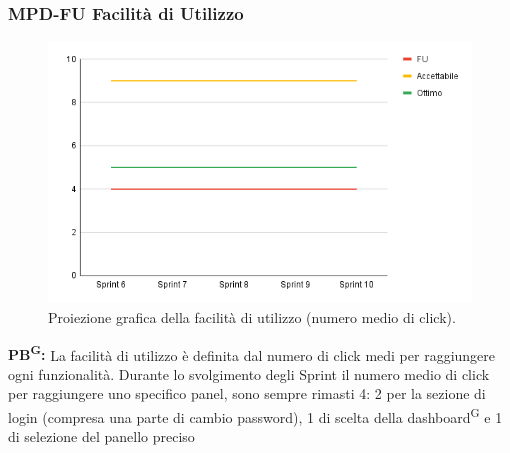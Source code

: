 \documentclass[8pt]{article}
\newcommand{\glossterm}[1]{#1\textsuperscript{G}} %
\begin{document}
\subsubsection{MPD-FU Facilità di Utilizzo}
\begin{figure}[h!]
    \centering
    \includegraphics[width=1\textwidth]{images_pdq/FU.png}
    \caption{Proiezione grafica della facilità di utilizzo (numero medio di click).}
    \label{fig:Proiezione grafica della facilità di utilizzo (numero medio di click)}
\end{figure}
\textbf{\glossterm{PB}:} La facilità di utilizzo è definita dal numero di click medi per raggiungere ogni funzionalità. Durante lo svolgimento degli Sprint il numero medio di click per raggiungere uno specifico panel, sono sempre rimasti 4: 2 per la sezione di login (compresa una parte di cambio password), 1 di scelta della \glossterm{dashboard} e 1 di selezione del panello preciso
\clearpage
\end{document}
